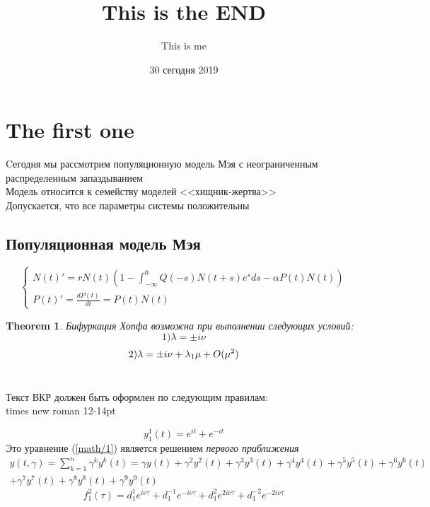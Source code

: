 \documentclass[12pt]{article}
\title{This is the END}
\author{This is me}
\date{ 30 сегодня 2019}
\begin{document}
\newtheorem{thmv}{Theorem}
\maketitle
\section{The first one}
Cегодня мы рассмотрим популяционную модель Мэя с неограниченным распределенным запаздыванием\\
Модель относится к семейству моделей <<хищник-жертва>>\\
Допускается, что все параметры системы положительны
\subsection{Популяционная модель Мэя}
\begin{equation*}
    \begin{cases}
    N(t)'=r N(t)(1-\int_{-\infty}^{0} Q(-s)N(t+s) e^s ds - \alpha P(t) N(t))\\ 
    P(t)'=\frac{d P(t)}{d t}= P(t)N(t)
\end{cases}
\end{equation*}
   \begin{thmv}
  Бифуркация Хопфа возможна при выполнении следующих условий:
    \[1)  \lambda=\pm i \nu \]
    \[2)  \lambda=\pm i \nu + \lambda \textsubscript{1} \mu + O(\mu \textsuperscript{2}) \] \ 
     \end{thmv}
    \begin{center}
        Текст ВКР должен быть оформлен по следующим правилам:\\
        \Large times new roman 12-14pt
    \end{center}
\begin{equation}
\label{math/1}
    y_1^1 (t)=e^{it}+e^{-it}
\end{equation}
Это уравнение (\ref{math/1}) является решением \emph{ первого приближения }
  \begin{multline}
      y(t,\gamma)=\sum_{k=1}^n \gamma^k y^k (t)= \gamma y(t)+\gamma^2 y^2(t)+\gamma^3 y^3(t)+\gamma^4 y^4 (t)  + \gamma^5 y^5(t)+\gamma^6 y^6(t) \\+\gamma^7 y^7(t) +\gamma^8 y^8(t)+\gamma^9 y^9(t)
 \label{math/2}
  \end{multline}
  \begin{equation*}
            f_1^2(\tau)=d_1^1 e^{i \nu \tau}+d_1^{-1} e^{-i \nu \tau} +d_1^2e^{2 i \nu \tau}+d_1^{-2}e^{-2 i \nu \tau}
  \end{equation*}
\end{document}
